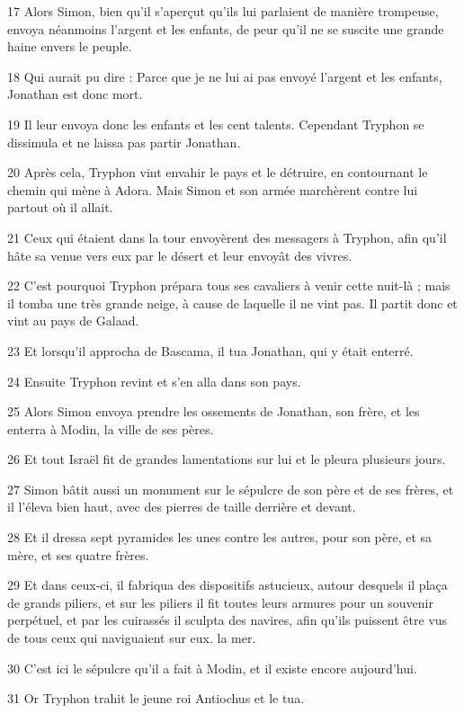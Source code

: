 \par 17 Alors Simon, bien qu'il s'aperçut qu'ils lui parlaient de manière trompeuse, envoya néanmoins l'argent et les enfants, de peur qu'il ne se suscite une grande haine envers le peuple.
\par 18 Qui aurait pu dire : Parce que je ne lui ai pas envoyé l'argent et les enfants, Jonathan est donc mort.
\par 19 Il leur envoya donc les enfants et les cent talents. Cependant Tryphon se dissimula et ne laissa pas partir Jonathan.
\par 20 Après cela, Tryphon vint envahir le pays et le détruire, en contournant le chemin qui mène à Adora. Mais Simon et son armée marchèrent contre lui partout où il allait.
\par 21 Ceux qui étaient dans la tour envoyèrent des messagers à Tryphon, afin qu'il hâte sa venue vers eux par le désert et leur envoyât des vivres.
\par 22 C'est pourquoi Tryphon prépara tous ses cavaliers à venir cette nuit-là ; mais il tomba une très grande neige, à cause de laquelle il ne vint pas. Il partit donc et vint au pays de Galaad.
\par 23 Et lorsqu'il approcha de Bascama, il tua Jonathan, qui y était enterré.
\par 24 Ensuite Tryphon revint et s'en alla dans son pays.
\par 25 Alors Simon envoya prendre les ossements de Jonathan, son frère, et les enterra à Modin, la ville de ses pères.
\par 26 Et tout Israël fit de grandes lamentations sur lui et le pleura plusieurs jours.
\par 27 Simon bâtit aussi un monument sur le sépulcre de son père et de ses frères, et il l'éleva bien haut, avec des pierres de taille derrière et devant.
\par 28 Et il dressa sept pyramides les unes contre les autres, pour son père, et sa mère, et ses quatre frères.
\par 29 Et dans ceux-ci, il fabriqua des dispositifs astucieux, autour desquels il plaça de grands piliers, et sur les piliers il fit toutes leurs armures pour un souvenir perpétuel, et par les cuirassés il sculpta des navires, afin qu'ils puissent être vus de tous ceux qui naviguaient sur eux. la mer.
\par 30 C'est ici le sépulcre qu'il a fait à Modin, et il existe encore aujourd'hui.
\par 31 Or Tryphon trahit le jeune roi Antiochus et le tua.

